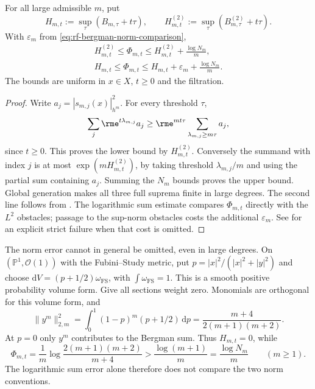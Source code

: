 \noindent\begin{minipage}{\linewidth}
\begin{lemma}\label{lem:rf-weighted-bergman-comparison}
For all large admissible $m$, put
\[
 H_{m,t}:=\sup_\tau(B_{m,\tau}+t\tau),
 \qquad H^{(2)}_{m,t}:=\sup_\tau(B^{(2)}_{m,\tau}+t\tau).
\]
With $\varepsilon_m$ from \eqref{eq:rf-bergman-norm-comparison},
\[
 \begin{gathered}
 H^{(2)}_{m,t}\leq\Phi_{m,t}
           \leq H^{(2)}_{m,t}+\frac{\log N_m}{m},\\
 H_{m,t}\leq\Phi_{m,t}
           \leq H_{m,t}+\varepsilon_m+\frac{\log N_m}{m}.
 \end{gathered}
\tag{65.23a}\label{eq:rf-weighted-bergman-comparison}
\]
The bounds are uniform in $x\in X$, $t\geq0$ and the filtration.
\end{lemma}
\end{minipage}\par

\begin{proof}
Write $a_j=|s_{m,j}(x)|_{h^m}^2$. For every threshold $\tau$,
\[
 \sum_j\rme^{t\lambda_{m,j}}a_j
   \geq\rme^{mt\tau}\sum_{\lambda_{m,j}\geq m\tau}a_j,
\]
since $t\geq0$. This proves the lower bound by $H^{(2)}_{m,t}$. Conversely the summand with index $j$ is at most $\exp(mH^{(2)}_{m,t})$, by taking threshold $\lambda_{m,j}/m$ and using the partial sum containing $a_j$. Summing the $N_m$ bounds proves the upper bound. Global generation makes all three full suprema finite in large degrees. The second line follows from . The logarithmic sum estimate compares $\Phi_{m,t}$ directly with the $L^2$ obstacles; passage to the sup-norm obstacles costs the additional $\varepsilon_m$. See  for an explicit strict failure when that cost is omitted.
\end{proof}

\noindent\begin{minipage}{\linewidth}
\begin{example}\label{ex:rf-bergman-volume-error}
The norm error cannot in general be omitted, even in large degrees. On $(\mathbb P^1,\mathcal O(1))$ with the Fubini--Study metric, put $p=|x|^2/(|x|^2+|y|^2)$ and choose $\mathrm dV=(p+1/2)\omega_{\mathrm{FS}}$, with $\int\omega_{\mathrm{FS}}=1$. This is a smooth positive probability volume form. Give all sections weight zero. Monomials are orthogonal for this volume form, and
\[
 \|y^m\|_{2,m}^2
   =\int_0^1(1-p)^m(p+1/2)\,\mathrm dp
   =\frac{m+4}{2(m+1)(m+2)}.
\]
At $p=0$ only $y^m$ contributes to the Bergman sum. Thus $H_{m,t}=0$, while
\[
 \Phi_{m,t}=\frac1m\log\frac{2(m+1)(m+2)}{m+4}
              >\frac{\log(m+1)}m=\frac{\log N_m}m
 \qquad(m\geq1).
\tag{65.23b}\label{eq:rf-bergman-volume-error}
\]
The logarithmic sum error alone therefore does not compare the two norm conventions.
\end{example}
\end{minipage}\par

